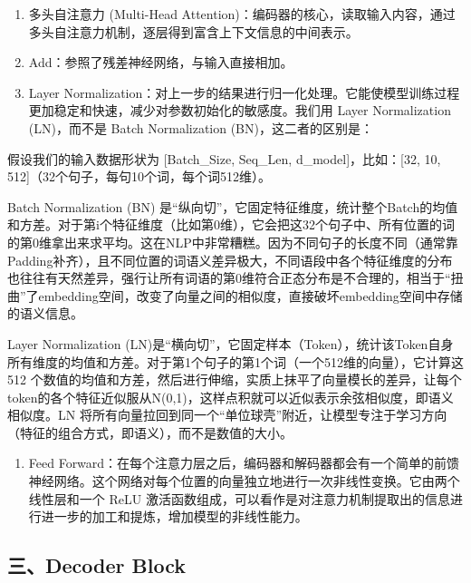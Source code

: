 \begin{enumerate}
\def\labelenumi{\arabic{enumi}.}
\item
  多头自注意力 (Multi-Head Attention)：编码器的核心，读取输入内容，通过多头自注意力机制，逐层得到富含上下文信息的中间表示。
\item
  Add：参照了残差神经网络，与输入直接相加。
\item
{}
  Layer Normalization：对上一步的结果进行归一化处理。它能使模型训练过程更加稳定和快速，减少对参数初始化的敏感度。我们用 Layer Normalization (LN)，而不是 Batch Normalization (BN)，这二者的区别是：
\end{enumerate}

假设我们的输入数据形状为 {[}Batch\_Size, Seq\_Len, d\_model{]}，比如：{[}32, 10, 512{]}（32个句子，每句10个词，每个词512维）。

Batch Normalization (BN) 是``纵向切''，它固定特征维度，统计整个Batch的均值和方差。对于第i个特征维度（比如第0维），它会把这32个句子中、所有位置的词的第0维拿出来求平均。这在NLP中非常糟糕。因为不同句子的长度不同（通常靠Padding补齐），且不同位置的词语义差异极大，不同语段中各个特征维度的分布也往往有天然差异，强行让所有词语的第0维符合正态分布是不合理的，相当于``扭曲''了embedding空间，改变了向量之间的相似度，直接破坏embedding空间中存储的语义信息。

Layer Normalization (LN)是``横向切''，它固定样本（Token），统计该Token自身所有维度的均值和方差。对于第1个句子的第1个词（一个512维的向量），它计算这 512 个数值的均值和方差，然后进行伸缩，实质上抹平了向量模长的差异，让每个token的各个特征近似服从N(0,1)，这样点积就可以近似表示余弦相似度，即语义相似度。LN 将所有向量拉回到同一个``单位球壳''附近，让模型专注于学习方向（特征的组合方式，即语义），而不是数值的大小。

\begin{enumerate}
\def\labelenumi{\arabic{enumi}.}
\setcounter{enumi}{3}
\tightlist
\item
  Feed Forward：在每个注意力层之后，编码器和解码器都会有一个简单的前馈神经网络。这个网络对每个位置的向量独立地进行一次非线性变换。它由两个线性层和一个 ReLU 激活函数组成，可以看作是对注意力机制提取出的信息进行进一步的加工和提炼，增加模型的非线性能力。
\end{enumerate}

\hypertarget{ux4e09decoder-block}{%
\subsection{三、Decoder Block}\label{ux4e09decoder-block}}

